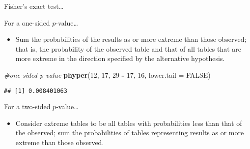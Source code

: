 \documentclass[
  ignorenonframetext,
  aspectratio=169]{beamer}
\newenvironment{Shaded}{\begin{snugshade}}{\end{snugshade}}
\newcommand{\AttributeTok}[1]{\textcolor[rgb]{0.13,0.29,0.53}{#1}}
\newcommand{\CommentTok}[1]{\textcolor[rgb]{0.56,0.35,0.01}{\textit{#1}}}
\newcommand{\ConstantTok}[1]{\textcolor[rgb]{0.56,0.35,0.01}{#1}}
\newcommand{\DecValTok}[1]{\textcolor[rgb]{0.00,0.00,0.81}{#1}}
\newcommand{\FunctionTok}[1]{\textcolor[rgb]{0.13,0.29,0.53}{\textbf{#1}}}
\newcommand{\NormalTok}[1]{#1}
\newcommand{\SpecialCharTok}[1]{\textcolor[rgb]{0.81,0.36,0.00}{\textbf{#1}}}
\providecommand{\tightlist}{%
  \setlength{\itemsep}{0pt}\setlength{\parskip}{0pt}}
\begin{document}
\begin{frame}[fragile]{Fisher's exact test\ldots{}}
\protect\hypertarget{fishers-exact-test-1}{}
\small

For a one-sided \(p\)-value\ldots{}

\begin{itemize}
\tightlist
\item
  Sum the probabilities of the results as or more extreme than those
  observed; that is, the probability of the observed table and that of
  all tables that are more extreme in the direction specified by the
  alternative hypothesis.
\end{itemize}

\scriptsize

\begin{Shaded}
\begin{Highlighting}[]
\CommentTok{\#one{-}sided p{-}value}
\FunctionTok{phyper}\NormalTok{(}\DecValTok{12}\NormalTok{, }\DecValTok{17}\NormalTok{, }\DecValTok{29} \SpecialCharTok{{-}} \DecValTok{17}\NormalTok{, }\DecValTok{16}\NormalTok{, }\AttributeTok{lower.tail =} \ConstantTok{FALSE}\NormalTok{)}
\end{Highlighting}
\end{Shaded}

\begin{verbatim}
## [1] 0.008401063
\end{verbatim}

\small

For a two-sided \(p\)-value\ldots{}

\begin{itemize}
\tightlist
\item
  Consider extreme tables to be all tables with probabilities less than
  that of the observed; sum the probabilities of tables representing
  results as or more extreme than those observed.
\end{itemize}
\end{frame}
\end{document}
